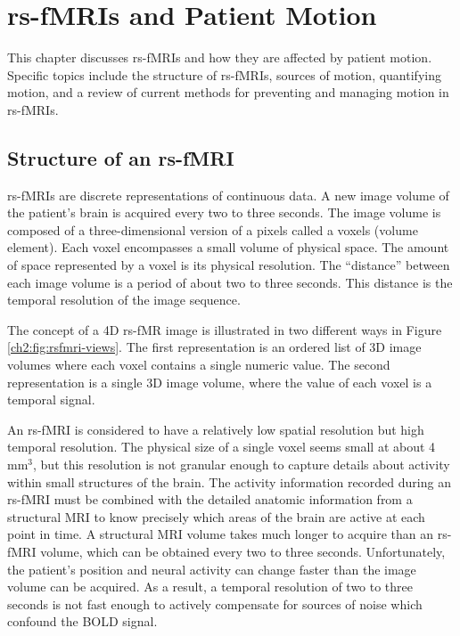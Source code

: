 \chapter{rs-fMRIs and Patient Motion}
\label{ch:mri}

This chapter discusses rs-fMRIs and how they are affected by patient motion. Specific topics include the structure of rs-fMRIs, sources of motion, quantifying motion, and a review of current methods for preventing and managing motion in rs-fMRIs.

\section{Structure of an rs-fMRI}

rs-fMRIs are discrete representations of continuous data. A new image volume of the patient's brain is acquired every two to three seconds. The image volume is composed of a three-dimensional version of a pixels called a voxels (volume element). Each voxel encompasses a small volume of physical space. The amount of space represented by a voxel is its physical resolution. The ``distance'' between each image volume is a period of about two to three seconds. This distance is the temporal resolution of the image sequence.

The concept of a 4D rs-fMR image is illustrated in two different ways in Figure \ref{ch2:fig:rsfmri-views}. The first representation is an ordered list of 3D image volumes where each voxel contains a single numeric value. The second representation is a single 3D image volume, where the value of each voxel is a temporal signal.

An rs-fMRI is considered to have a relatively low spatial resolution but high temporal resolution. The physical size of a single voxel seems small at about 4 mm$^3$, but this resolution is not granular enough to capture details about activity within small structures of the brain. The activity information recorded during an rs-fMRI must be combined with the detailed anatomic information from a structural MRI to know precisely which areas of the brain are active at each point in time. A structural MRI volume takes much longer to acquire than an rs-fMRI volume, which can be obtained every two to three seconds. Unfortunately, the patient's position and neural activity can change faster than the image volume can be acquired. As a result, a temporal resolution of two to three seconds is not fast enough to actively compensate for sources of noise which confound the BOLD signal. 

